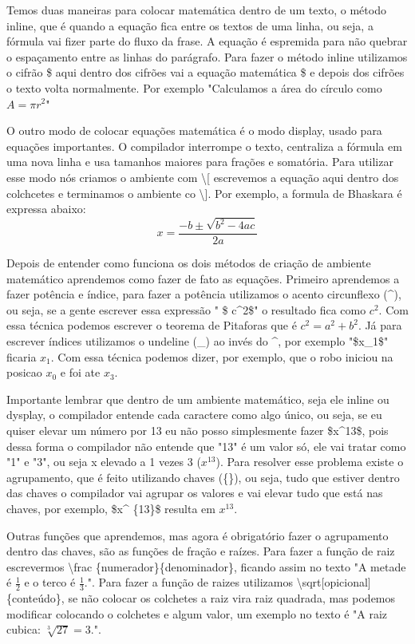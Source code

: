 Temos duas maneiras para colocar matemática dentro de um texto, o método inline, que é quando a equação fica entre os textos de uma linha, ou seja, a fórmula vai fizer parte do fluxo da frase. A equação é espremida para não quebrar o espaçamento entre as linhas do parágrafo. Para fazer o método inline utilizamos o cifrão \$ aqui dentro dos cifrões vai a equação matemática \$ e depois dos cifrões o texto volta normalmente. Por exemplo "Calculamos a área do círculo como $A = \pi r^2$"

O outro modo de colocar equações matemática é o modo display, usado para equações importantes. O compilador interrompe o texto, centraliza a fórmula em uma nova linha e usa tamanhos maiores para frações e somatória. Para utilizar esse modo nós criamos o ambiente com \textbackslash [ escrevemos a equação aqui dentro dos colchcetes e terminamos o ambiente co \textbackslash ].
Por exemplo, a formula de Bhaskara é expressa abaixo:
\[x = \frac{-b \pm \sqrt{b^2- 4ac}}{2a}\]

Depois de entender como funciona os dois métodos de criação de ambiente matemático aprendemos como fazer de fato as equações. Primeiro aprendemos a fazer potência e índice, para fazer a potência utilizamos o acento circunflexo (\^{}), ou seja, se a gente escrever essa expressão " \$ c\^{}2\$" o resultado fica como $c^2$. Com essa técnica podemos escrever o teorema de Pitaforas que é $c^2 = a^2 + b^2$. Já para escrever índices utilizamos o undeline (\_) ao invés do \^{}, por exemplo "\$x\_1\$" ficaria $x_1$. Com essa técnica podemos dizer, por exemplo, que o robo iniciou na posicao $x_0$ e foi ate $x_3$.

Importante lembrar que dentro de um ambiente matemático, seja ele inline ou dysplay, o compilador entende cada caractere como algo único, ou seja, se eu quiser elevar um número por 13 eu não posso simplesmente fazer \$x\^{}13\$, pois dessa forma o compilador não entende que "13" é um valor só, ele vai tratar como "1" e "3", ou seja x elevado a 1 vezes 3 ($x^13$). Para resolver esse problema existe o agrupamento, que é feito utilizando chaves (\{\}), ou seja, tudo que estiver dentro das chaves o compilador vai agrupar os valores e vai elevar tudo que está nas chaves, por exemplo, \$x\^{} \{13\}\$ resulta em $x^{13}$.

Outras funções que aprendemos, mas agora é obrigatório fazer o agrupamento dentro das chaves, são as funções de fração e raízes. Para fazer a função de raiz escrevermos \textbackslash frac \{numerador\}\{denominador\}, ficando assim no texto "A metade é $\frac{1}{2}$ e o terco é $\frac{1}{3}$.". Para fazer a função de raizes utilizamos \textbackslash sqrt[opicional]\{conteúdo\}, se não colocar os colchetes a raiz vira raiz quadrada, mas podemos modificar colocando o colchetes e algum valor, um exemplo no texto é "A raiz cubica: $\sqrt[3]{27} = 3$.".

